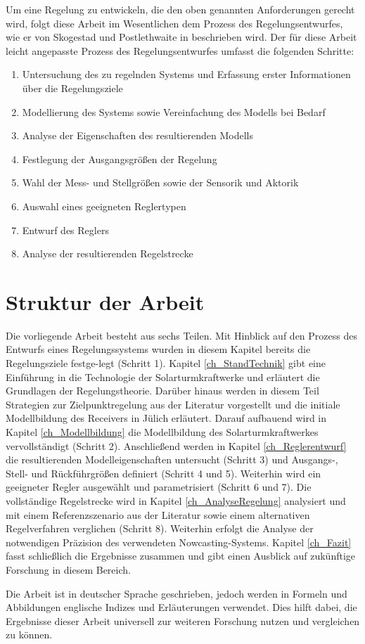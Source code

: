 Um eine Regelung zu entwickeln, die den oben genannten Anforderungen gerecht wird, folgt diese Arbeit im Wesentlichen dem Prozess des Regelungsentwurfes, wie er von Skogestad und Postlethwaite in \cite[S.1]{Skogestad} beschrieben wird.
Der für diese Arbeit leicht angepasste Prozess des Regelungsentwurfes umfasst die folgenden Schritte:
\begin{enumerate}
    \item Untersuchung des zu regelnden Systems und Erfassung erster Informationen über die Regelungsziele
    \item Modellierung des Systems sowie Vereinfachung des Modells bei Bedarf
    \item Analyse der Eigenschaften des resultierenden Modells
    \item Festlegung der Ausgangsgrößen der Regelung
    \item Wahl der Mess- und Stellgrößen sowie der Sensorik und Aktorik
    \item Auswahl eines geeigneten Reglertypen
    \item Entwurf des Reglers
    \item Analyse der resultierenden Regelstrecke
\end{enumerate}


\section{Struktur der Arbeit} \label{sec_Struktur}
Die vorliegende Arbeit besteht aus sechs Teilen.
Mit Hinblick auf den Prozess des Entwurfs eines Regelungssystems wurden in diesem Kapitel bereits die Regelungsziele festge-\linebreak legt (Schritt 1).
Kapitel \ref{ch_StandTechnik} gibt eine Einführung in die Technologie der Solarturmkraftwerke und erläutert die Grundlagen der Regelungstheorie.
Darüber hinaus werden in diesem Teil Strategien zur Zielpunktregelung aus der Literatur vorgestellt und die initiale Modellbildung des Receivers in Jülich erläutert.
Darauf aufbauend wird in Kapitel \ref{ch_Modellbildung} die Modellbildung des Solarturmkraftwerkes vervollständigt (Schritt 2).
Anschließend werden in Kapitel \ref{ch_Reglerentwurf} die resultierenden Modelleigenschaften untersucht (Schritt 3) und Ausgangs-, Stell- und Rückführgrößen definiert (Schritt 4 und 5).
Weiterhin wird ein geeigneter Regler ausgewählt und parametrisiert (Schritt 6 und 7).
Die vollständige Regelstrecke wird in Kapitel \ref{ch_AnalyseRegelung} analysiert und mit einem Referenzszenario aus der Literatur sowie einem alternativen Regelverfahren verglichen (Schritt 8).
Weiterhin erfolgt die Analyse der notwendigen Präzision des verwendeten Nowcasting-Systems.
Kapitel \ref{ch_Fazit} fasst schließlich die Ergebnisse zusammen und gibt einen Ausblick auf zukünftige Forschung in diesem Bereich.

Die Arbeit ist in deutscher Sprache geschrieben, jedoch werden in Formeln und Abbildungen englische Indizes und Erläuterungen verwendet.
Dies hilft dabei, die Ergebnisse dieser Arbeit universell zur weiteren Forschung nutzen und vergleichen zu können.


